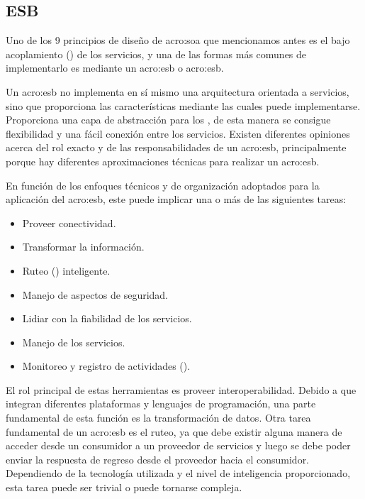 
\subsection{ESB}
\label{esb:introduccion}


Uno de los 9 principios de diseño de \gls{acro:soa} que mencionamos antes es el bajo acoplamiento () de los servicios, y una de las formas más comunes de implementarlo es mediante un \acrlong{acro:esb} o \gls{acro:esb}.

Un \gls{acro:esb} no implementa en sí mismo una arquitectura orientada a servicios, sino que proporciona las características mediante las cuales puede implementarse. Proporciona una capa de abstracción para los , de esta manera se consigue flexibilidad y una fácil conexión entre los servicios. Existen diferentes opiniones acerca del rol exacto y de las responsabilidades de un \gls{acro:esb}, principalmente porque hay diferentes aproximaciones técnicas para realizar un \gls{acro:esb}\cite[p.~47]{josuttis2007}.

En función de los enfoques técnicos y de organización adoptados para la aplicación del \gls{acro:esb}, este puede implicar una o más de las siguientes tareas:

\begin{itemize}
  \item Proveer conectividad.
  \item Transformar la información.
  \item Ruteo () inteligente.
  \item Manejo de aspectos de seguridad.
  \item Lidiar con la fiabilidad de los servicios.
  \item Manejo de los servicios.
  \item Monitoreo y registro de actividades ().
\end{itemize}

El rol principal de estas herramientas es proveer interoperabilidad. Debido a que integran diferentes plataformas y lenguajes de programación, una parte fundamental de esta función es la transformación de datos.
Otra tarea fundamental de un \gls{acro:esb} es el ruteo, ya que debe existir alguna manera de acceder desde un consumidor a un proveedor de servicios y luego se debe poder enviar la respuesta de regreso desde el proveedor hacia el consumidor. Dependiendo de la tecnología utilizada y el nivel de inteligencia proporcionado, esta tarea puede ser trivial o puede tornarse compleja.

